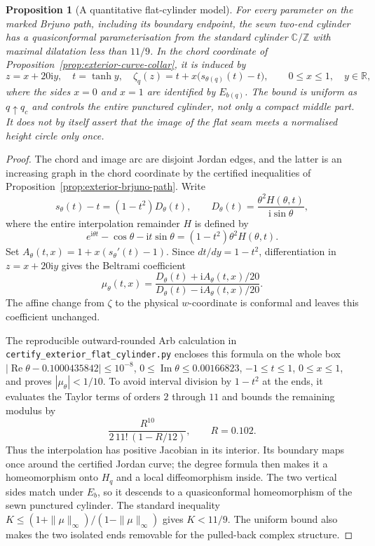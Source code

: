 \documentclass[11pt,a4paper]{article}
\newtheorem{proposition}[theorem]{Proposition}
\theoremstyle{definition}
\newcommand{\ii}{\mathrm{i}}
\begin{document}
\begin{proposition}[A quantitative flat-cylinder model]
\label{prop:exterior-flat-cylinder}
For every parameter on the marked Brjuno path, including its boundary
endpoint, the sewn two-end cylinder has a quasiconformal
parameterisation from the standard cylinder $\mathbb C/\mathbb Z$
with maximal dilatation less than $11/9$.  In the chord coordinate of
Proposition~\ref{prop:exterior-curve-collar}, it is induced by
\[
 z=x+20\ii y,\quad t=\tanh y,\quad
 \zeta_q(z)=t+x\bigl(s_{\theta(q)}(t)-t\bigr),
 \qquad 0\le x\le1,\quad y\in\mathbb R,
\]
where the sides $x=0$ and $x=1$ are identified by $E_{b(q)}$.
The bound is uniform as $q\uparrow q_c$ and controls the entire
punctured cylinder, not only a compact middle part.  It does not by
itself assert that the image of the flat seam meets a normalised
height circle only once.
\end{proposition}

\begin{proof}
The chord and image arc are disjoint Jordan edges, and the latter is
an increasing graph in the chord coordinate by the certified
inequalities of Proposition~\ref{prop:exterior-brjuno-path}.  Write
\[
 s_\theta(t)-t=(1-t^2)D_\theta(t),\qquad
 D_\theta(t)=\frac{\theta^2H(\theta,t)}{\ii\sin\theta},
\]
where the entire interpolation remainder $H$ is defined by
\[
 e^{\ii\theta t}-\cos\theta-\ii t\sin\theta
       =(1-t^2)\theta^2H(\theta,t).
\]
Set $A_\theta(t,x)=1+x(s_\theta'(t)-1)$.
Since $dt/dy=1-t^2$, differentiation in $z=x+20\ii y$
gives the Beltrami coefficient
\[
 \mu_\theta(t,x)=
 \frac{D_\theta(t)+\ii A_\theta(t,x)/20}
      {D_\theta(t)-\ii A_\theta(t,x)/20}.
\]
The affine change from $\zeta$ to the physical $w$-coordinate is
conformal and leaves this coefficient unchanged.

The reproducible outward-rounded Arb calculation in
\texttt{certify\_exterior\_flat\_cylinder.py} encloses this formula
on the whole box
$|\operatorname{Re}\theta-0.1000435842|\le10^{-8}$,
$0\le\operatorname{Im}\theta\le0.00166823$,
$-1\le t\le1$, $0\le x\le1$, and proves
$|\mu_\theta|<1/10$.  To avoid interval division by $1-t^2$ at the
ends, it evaluates the Taylor terms of orders $2$ through $11$ and bounds
the remaining modulus by
\[
 \frac{R^{10}}{2\,11!\,(1-R/12)},\qquad R=0.102.
\]
Thus the interpolation has positive Jacobian in its interior.  Its
boundary maps once around the certified Jordan curve; the degree
formula then makes it a homeomorphism onto $H_q$ and a local
diffeomorphism inside.  The two vertical sides match under $E_b$,
so it descends to a quasiconformal homeomorphism of the sewn
punctured cylinder.  The standard inequality
$K\le(1+\|\mu\|_\infty)/(1-\|\mu\|_\infty)$ gives $K<11/9$.
The uniform bound also makes the two isolated ends removable for the
pulled-back complex structure.
\end{proof}
\end{document}
